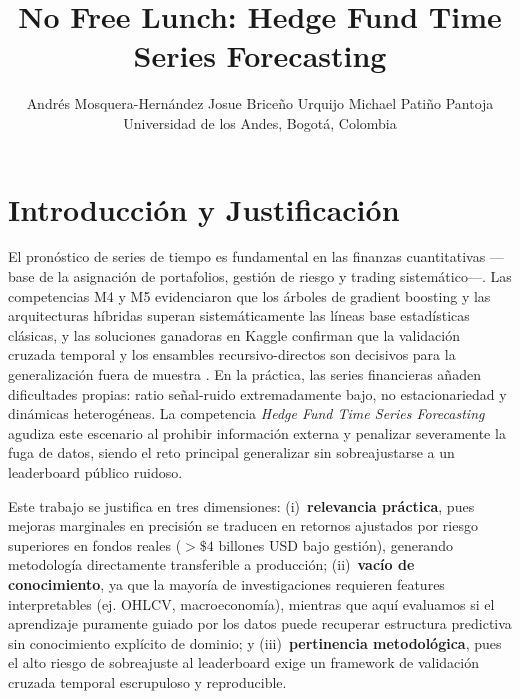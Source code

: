 \documentclass{article}
\title{No Free Lunch: Hedge Fund Time Series Forecasting}
\author{%
  Andrés Mosquera-Hernández \quad Josue Briceño Urquijo \quad Michael Patiño Pantoja \\
  Universidad de los Andes, Bogotá, Colombia \\
}
\begin{document}
\maketitle




\section{Introducción y Justificación}

El pronóstico de series de tiempo es fundamental en las finanzas cuantitativas —base de la asignación de portafolios, gestión de riesgo y trading sistemático—. Las competencias M4 \citep{makridakis2020m4} y M5 \citep{makridakis2022m5} evidenciaron que los árboles de gradient boosting \citep{ke2017lightgbm} y las arquitecturas híbridas superan sistemáticamente las líneas base estadísticas clásicas, y las soluciones ganadoras en Kaggle confirman que la validación cruzada temporal y los ensambles recursivo-directos son decisivos para la generalización fuera de muestra \citep{m5first2020, kaggleguide}. En la práctica, las series financieras añaden dificultades propias: ratio señal-ruido extremadamente bajo, no estacionariedad y dinámicas heterogéneas. La competencia \emph{Hedge Fund Time Series Forecasting} \citep{adatacompany2026} agudiza este escenario al prohibir información externa y penalizar severamente la fuga de datos, siendo el reto principal generalizar sin sobreajustarse a un leaderboard público ruidoso.

Este trabajo se justifica en tres dimensiones: (i)~\textbf{relevancia práctica}, pues mejoras marginales en precisión se traducen en retornos ajustados por riesgo superiores en fondos reales ($>\$4$ billones USD bajo gestión), generando metodología directamente transferible a producción; (ii)~\textbf{vacío de conocimiento}, ya que la mayoría de investigaciones requieren features interpretables (ej. OHLCV, macroeconomía), mientras que aquí evaluamos si el aprendizaje puramente guiado por los datos puede recuperar estructura predictiva sin conocimiento explícito de dominio; y (iii)~\textbf{pertinencia metodológica}, pues el alto riesgo de sobreajuste al leaderboard exige un framework de validación cruzada temporal escrupuloso y reproducible.
\end{document}
